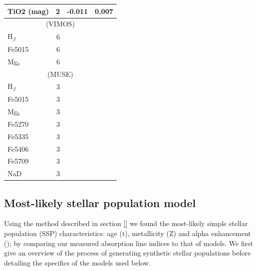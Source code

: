\begin{table}
\begin{tabular}{l r r r}
			TiO2 (mag)	& 2 		& -0.011	& 0.007	\\
			\hline
			\multicolumn{4}{c}{\citet{Ogando2008} (VIMOS)} \\
			\hline
			H$_\beta$ 	& 6 		& 		& 	\\
			Fe5015 		& 6 		& 		& 	\\
			Mg$_b$ 		& 6 		& 		& 	\\
			\hline
			\multicolumn{4}{c}{\citet{Ogando2008} (MUSE)} \\
			\hline
			H$_\beta$ 	& 3 		& 		& 	\\ 
			Fe5015 		& 3 		& 		& 	\\ 
			Mg$_b$ 		& 3 		& 		& 	\\
			Fe5270 		& 3 		& 		& 	\\
			Fe5335 		& 3 		& 		& 	\\
			Fe5406 		& 3 		& 		& 	\\
			Fe5709 		& 3 		& 		& 	\\
			NaD 		& 3 		& 		& 	\\
			\hline
		\end{tabular}
	\end{table}



	\subsection{Most-likely stellar population model}
		\label{subsec:ssp}


		Using the method described in section \ref{} we found the most-likely simple stellar population (SSP) characteristics: age (t), metallicity (Z) and alpha enhancement (\textalpha); by comparing our measured absorption line indices to that of models. We first give an overview of the process of generating synthetic stellar populations before detailing the specifics of the models used below. 

